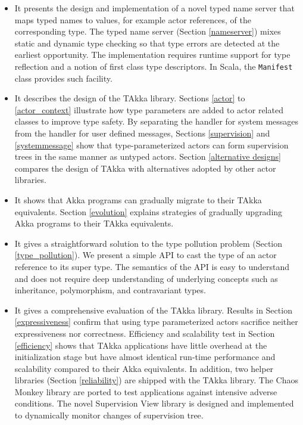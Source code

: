 \begin{itemize}
 \item It presents the design and implementation of a novel typed name server
that maps typed names to values, for example actor references, of the 
corresponding type.  The typed name server (Section \ref{nameserver}) mixes 
static and dynamic type checking so that type  errors are detected at the earliest 
opportunity.  The implementation requires runtime support for type reflection and 
a notion of first class type descriptors.  In Scala, the {\tt Manifest} class 
provides such facility.

 \item It describes the design of the TAkka library.  Sections \ref{actor} to
\ref{actor_context} illustrate how type parameters are added to actor related
classes to improve type safety.   By separating the handler for system 
messages from the handler for user defined messages, Sections \ref{supervision}
and \ref{systemmessage} show that type-parameterized actors can form
supervision trees in the same manner as untyped actors. Section \ref{alternative
designs} compares the design of TAkka with alternatives adopted by other actor 
libraries.

 \item It shows that Akka programs can gradually migrate to their TAkka 
equivalents.  Section \ref{evolution} explains strategies of gradually 
upgrading Akka programs to their TAkka equivalents.
 
 \item It gives a straightforward solution to the type pollution problem 
(Section \ref{type_pollution}).  We present a simple API to cast
the type of an actor reference to its super type.  The semantics of the API is 
easy to understand and does not require deep understanding of
underlying concepts such as inheritance, polymorphism, and contravariant 
types.
 
 \item It gives a comprehensive evaluation of the TAkka library.  Results in
Section \ref{expressiveness} confirm that using type parameterized actors 
sacrifice neither expressiveness nor correctness.  Efficiency and 
scalability test in Section \ref{efficiency} shows that TAkka applications have 
little overhead at the initialization stage but have almost identical run-time 
performance and scalability compared to their Akka equivalents.  In 
addition, two helper libraries (Section \ref{reliability}) are shipped with the 
TAkka library.  The Chaos Monkey library are ported to test applications 
against intensive adverse conditions.  The novel Supervision View library is 
designed and implemented to dynamically monitor changes of supervision tree.
 
\end{itemize}
